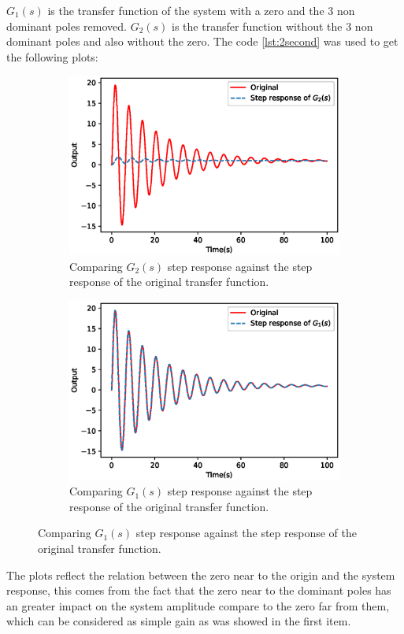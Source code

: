 \documentclass[a4paper]{article}
\begin{document}
$G_1(s)$ is the transfer function of the system with a zero and the 3 non dominant poles removed. $G_2(s)$ is the transfer function without the 3 non dominant poles and also without the zero. The code \ref{lst:2second} was used to get the following plots:  
\begin{figure}[H]
\begin{subfigure}{.5\textwidth}
  \centering
  \includegraphics[width=.8\linewidth]{Figures/Question2/EXE_2_ITEM_3.eps}  
  \caption{Comparing $G_2(s)$ step response against the step response of the original transfer function.} 
  \label{fig:EXE_2_ITEM_3}
\end{subfigure}
\begin{subfigure}{.5\textwidth}
  \centering
  \includegraphics[width=.8\linewidth]{Figures/Question2/EXE_2_ITEM_4.eps} 
\caption{Comparing $G_1(s)$ step response against the step response of the original transfer function.}  
	\label{fig:EXE_2_ITEM_4}
\end{subfigure}
\end{figure}

The plots reflect the relation between the zero near to the origin and the system response, this comes from the fact that the zero near to the dominant poles has an greater impact on the system amplitude compare to the zero far from them, which can be considered as simple gain as was showed in the first item.
\end{document}
